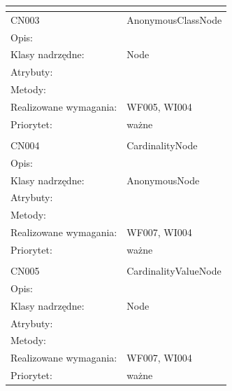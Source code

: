 \documentclass[a4paper,10pt]{article}
\begin{document}
\begin{center}
\begin{longtable}{|m{3cm}|m{9cm}|}
\multicolumn{2}{c}{} \\
 \hline

CN003 & AnonymousClassNode \\ \hline
Opis: &     \\ \hline
Klasy nadrzędne: & Node     \\ \hline
Atrybuty: & %
 \\ \hline
Metody: & %
  \\ \hline
Realizowane wymagania: & WF005, WI004 \\ \hline
Priorytet: & ważne \\ \hline

\multicolumn{2}{c}{} \\
 \hline

CN004 & CardinalityNode \\ \hline
Opis: &     \\ \hline
Klasy nadrzędne: & AnonymousNode     \\ \hline
Atrybuty: & %
 \\ \hline
Metody: & %
  \\ \hline
Realizowane wymagania: & WF007, WI004 \\ \hline
Priorytet: & ważne  \\ \hline

\multicolumn{2}{c}{} \\
 \hline

CN005 & CardinalityValueNode \\ \hline
Opis: &     \\ \hline
Klasy nadrzędne: & Node     \\ \hline
Atrybuty: & %
 \\ \hline
Metody: & %
  \\ \hline
Realizowane wymagania: & WF007, WI004 \\ \hline
Priorytet: & ważne  \\ \hline


\end{longtable}
\end{center}
\end{document}

